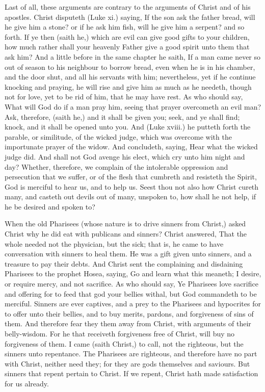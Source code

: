 Last of all, these arguments are contrary to the arguments
of Christ and of his apostles. Christ disputeth 
(Luke xi.) saying, If the son ask the father bread, will he 
give him a stone? or if he ask him fish, will he give him a 
serpent? and so forth. If ye then (saith he,) which are 
evil can give good gifts to your children, how much rather 
shall your heavenly Father give a good spirit unto them 
that ask him? And a little before in the same chapter he 
saith, If a man came never so out of season to his neighbour
to borrow bread, even when he is in his chamber, 
and the door shut, and all his servants with him; nevertheless,
yet if he continue knocking and praying, he will 
rise and give him as much as he needeth, though not for 
love, yet to be rid of him, that he may have rest. As who 
should say, What will God do if a man pray him, seeing 
that prayer overcometh an evil man? Ask, therefore, 
(saith he,) and it shall be given you; seek, and ye shall 
find; knock, and it shall be opened unto you. And 
(Luke xviii.) he putteth forth the parable, or similitude, 
of the wicked judge, which was overcome with the importunate
prayer of the widow. And concludeth, saying, 
Hear what the wicked judge did. And shall not God 
avenge his elect, which cry unto him night and day? 
Whether, therefore, we complain of the intolerable oppression
and persecution that we suffer, or of the flesh that 
cumbreth and resisteth the Spirit, God is merciful to hear 
us, and to help us. Seest thou not also how Christ cureth 
many, and casteth out devils out of many, unspoken to, 
how shall he not help, if he be desired and spoken to? 

When the old Pharisees (whose nature is to drive 
sinners from Christ,) asked Christ why he did eat with 
publicans and sinners? Christ answered, That the whole 
needed not the physician, but the sick; that is, he came to 
have conversation with sinners to heal them. He was a 
gift given unto sinners, and a treasure to pay their debts. 
And Christ sent the complaining and disdaining Pharisees 
to the prophet Hosea, saying, Go and learn what this 
meaneth; I desire, or require mercy, and not sacrifice. As 
who should say, Ye Pharisees love sacrifice and offering 
for to feed that god your bellies withal, but God commandeth
to be merciful. Sinners are ever captives, and 
a prey to the Pharisees and hypocrites for to offer unto 
their bellies, and to buy merits, pardons, and forgiveness 
of sins of them. And therefore fear they them away from 
Christ, with arguments of their belly-wisdom. For he 
that receiveth forgiveness free of Christ, will buy no forgiveness
of them. I came (saith Christ,) to call, not the 
righteous, but the sinners unto repentance. The Pharisees
are righteous, and therefore have no part with Christ, 
neither need they; for they are gods themselves and 
saviours. But sinners that repent pertain to Christ. 
If we repent, Christ hath made satisfaction for us 
already. 

